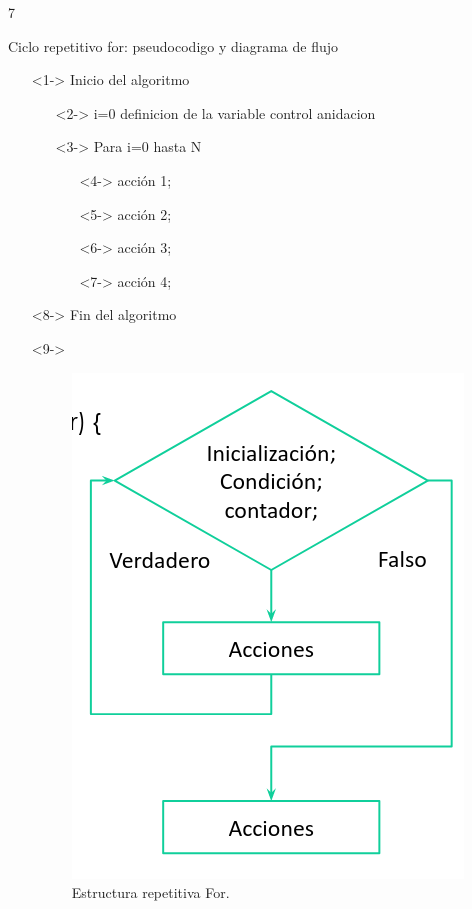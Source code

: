 7\documentclass[xcolor=pdftex,table,11pt]{beamer}
\begin{document}
\begin{frame}{Ciclo repetitivo for: pseudocodigo y diagrama de flujo }

\begin{itemize}
   \item[]<1-> Inicio del algoritmo

   \begin{itemize}
   		\item[]<2-> i=0 definicion de la variable control
     	anidacion\item[]<3-> Para i=0 hasta N
     	\begin{itemize}
     			\item[]<4->  acción 1;
     			\item[]<5->  acción 2;
     			\item[]<6->  acción 3;
     			\item[]<7->  acción 4;
     	\end{itemize}
   \end{itemize}
  \item[]<8-> Fin del algoritmo
  \item[]<9-> 
   \begin{figure}
 \centering
\includegraphics[scale=0.25]{../img/exported/for.png}
\caption{Estructura repetitiva For.}
\end{figure}
\end{itemize}
\end{frame}
\end{document}

